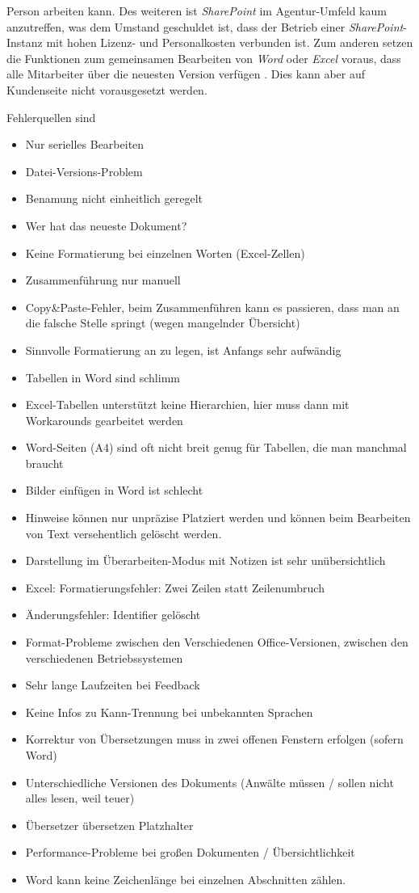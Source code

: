 Person arbeiten kann. Des weiteren ist \emph{SharePoint} im Agentur-Umfeld kaum anzutreffen, was dem Umstand geschuldet ist, dass der Betrieb einer \emph{SharePoint}-Instanz mit hohen Lizenz- und Personalkosten verbunden ist. Zum anderen setzen die Funktionen zum gemeinsamen Bearbeiten von \emph{Word} oder \emph{Excel} voraus, dass alle Mitarbeiter über die neuesten Version verfügen \cite{sharepoint-wordversions}. Dies kann aber auf Kundenseite nicht vorausgesetzt werden.


Fehlerquellen sind

\begin{itemize}
\item Nur serielles Bearbeiten
\item Datei-Versions-Problem
\item Benamung nicht einheitlich geregelt
\item Wer hat das neueste Dokument?
\item Keine Formatierung bei einzelnen Worten (Excel-Zellen)
\item Zusammenführung nur manuell
\item Copy\&Paste-Fehler, beim Zusammenführen kann es passieren, dass man an die falsche Stelle springt (wegen mangelnder Übersicht)
\item Sinnvolle Formatierung an zu legen, ist Anfangs sehr aufwändig
\item Tabellen in Word sind schlimm
\item Excel-Tabellen unterstützt keine Hierarchien, hier muss dann mit Workarounds gearbeitet werden
\item Word-Seiten (A4) sind oft nicht breit genug für Tabellen, die man manchmal braucht
\item Bilder einfügen in Word ist schlecht
\item Hinweise können nur unpräzise Platziert werden und können beim Bearbeiten von Text versehentlich gelöscht werden.
\item Darstellung im Überarbeiten-Modus mit Notizen ist sehr unübersichtlich
\item Excel: Formatierungsfehler: Zwei Zeilen statt Zeilenumbruch
\item Änderungsfehler: Identifier gelöscht
\item Format-Probleme zwischen den Verschiedenen Office-Versionen, zwischen den verschiedenen Betriebssystemen
\item Sehr lange Laufzeiten bei Feedback
\item Keine Infos zu Kann-Trennung bei unbekannten Sprachen
\item Korrektur von Übersetzungen muss in zwei offenen Fenstern erfolgen (sofern  Word)
\item Unterschiedliche Versionen des Dokuments (Anwälte müssen / sollen nicht alles lesen, weil teuer)
\item Übersetzer übersetzen Platzhalter
\item Performance-Probleme bei großen Dokumenten / Übersichtlichkeit
\item Word kann keine Zeichenlänge bei einzelnen Abschnitten zählen.
\end{itemize}



